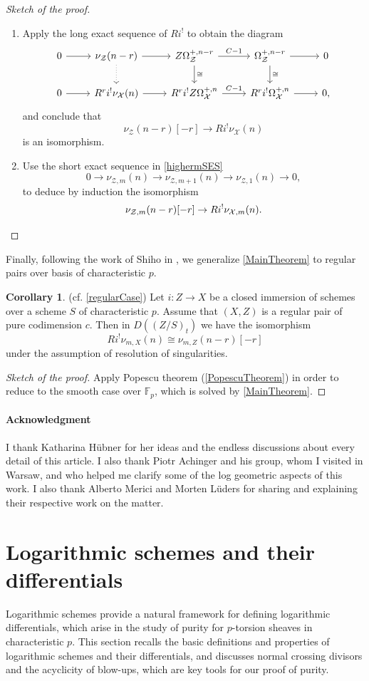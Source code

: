 \documentclass{amsart}
\theoremstyle{definition}
\newtheorem{corollary}[theorem]{Corollary}
\newcommand{\mF}{\mathbb{F}}
\numberwithin{equation}{section}
\begin{document}
\begin{proof}[Sketch of the proof]
\begin{enumerate}
		\item Apply the long exact sequence of $Ri^!$ to obtain the diagram 
		\[
		\begin{tikzcd}
			0\ar[r] &\nu_{\mathcal{Z}}(n-r)\ar[r]\arrow[dotted,d]&Z\Omega_{\mathcal{Z}}^{+,n-r}\ar[r,"C-1"]\arrow[d,"\cong"] &\Omega^{+,n-r}_{\mathcal{Z}}\ar[d,"\cong"]\ar[r]&0\\
			0\ar[r] &R^ri^!\nu_{\mathcal{X}}(n)\ar[r]&R^ri^!Z\Omega_{\mathcal{X}}^{+,n}\ar[r,"C-1"]&R^ri^!\Omega_{\mathcal{X}}^{+,n}\ar[r]&0,
		\end{tikzcd}
		\] and conclude that 
		\[
		\nu_{\mathcal{Z}}(n-r)[-r]\to Ri^!\nu_{\mathcal{X}}(n)
		\]
		is an isomorphism.
		\item Use the short exact sequence in \cref{highermSES}
		\[
		0\to \nu_{\mathcal{Z},m}(n)\to \nu_{\mathcal{Z},m+1}(n)\to \nu_{\mathcal{Z},1}(n)\to 0,
		\] 
		to deduce by induction the isomorphism
		\[
		\nu_{\mathcal{Z},m}(n-r)[-r]\to Ri^!\nu_{\mathcal{X},m}(n).\qedhere
		\]
	\end{enumerate}
\end{proof}
Finally, following the work of Shiho in \cite{Shiho}, we generalize \cref{MainTheorem} to regular pairs over basis of characteristic $p$.
\begin{corollary}(cf. \cref{regularCase})
		Let $i: Z\to X$ be a closed immersion of  schemes over a  scheme $S$ of characteristic $p$. Assume that $(X,Z)$ is a regular pair of pure codimension $c$. Then  in $D((Z/S)_t)$ we have the isomorphism 
	\[
	Ri^!\nu_{m,X}(n)\cong \nu_{m,Z}(n-r)[-r]
	\]
	under the assumption of resolution of singularities.
\end{corollary}
\begin{proof}[Sketch of the proof]
	Apply Popescu theorem (\cref{PopescuTheorem}) in order to reduce to the smooth case over $\mF_p$, which is solved by \cref{MainTheorem}.
\end{proof}

\paragraph{Acknowledgment}
I thank Katharina Hübner for her ideas and the endless discussions about every detail of this article. I also thank Piotr Achinger and his group, whom I visited in Warsaw, and who helped me clarify some of the log geometric aspects of this work. I also thank Alberto Merici and Morten Lüders for sharing and explaining their respective work on the matter.
\section{Logarithmic schemes and their differentials}
Logarithmic schemes provide a natural framework for defining logarithmic differentials, which arise in the study of purity for $p$-torsion sheaves in characteristic $p$. This section recalls the basic definitions and properties of logarithmic schemes and their differentials, and discusses normal crossing divisors and the acyclicity of blow-ups, which are key tools for our proof of purity.
\end{document}
